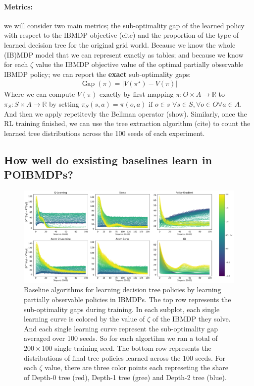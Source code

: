 \paragraph{Metrics:} we will consider two main metrics; the sub-optimality gap of the learned policy with respect to the IBMDP objective (cite) and the proportion of the type of learned decision tree for the original grid world.
Because we know the whole (IB)MDP model that we can represent exactly as tables; and because we know for each $\zeta$ value the IBMDP objective value of the optimal partially observable IBMDP policy; we can report the \textbf{exact} sub-optimality gaps:
\begin{align*}
    \operatorname{Gap}(\pi) = |V(\pi^{\star}) - V(\pi)|
\end{align*}
Where we can compute $V(\pi)$ exactly by first mapping $\pi : O \times A \rightarrow \mathbb{R}$ to $\pi_{S} : S \times A \rightarrow \mathbb{R}$ by setting $\pi_S (s, a) = \pi(o,a) \text{ if }o\in s$ $\forall s \in S, \forall o \in O \forall a \in A$.
And then we apply repetitevly the Bellman operator (show).
Similarly, once the RL training finished, we can use the tree extraction algorithm (cite) to count the learned tree distributions across the 100 seeds of each experiment.

\subsection{How well do exsisting baselines learn in POIBMDPs?}

\begin{figure}
    \centering
    \includegraphics[width=1\textwidth]{images/images_part1/learning_curves.pdf}
    \caption{Baseline algorithms for learning decision tree policies by learning partially observable policies in IBMDPs. 
    The top row represents the sub-optimality gaps during training. In each subplot, each single learning curve is colored by the value of $\zeta$ of the IBMDP they solve. And each single learning curve represent the sub-optimality gap averaged over 100 seeds.
    So for each algortihm we ran a total of $200 \times 100$ single training seed.
    The bottom row represents the distributions of final tree policies learned across the 100 seeds.
    For each $\zeta$ value, there are three color points each represeting the share of Depth-0 tree (red), Depth-1 tree (gree) and Depth-2 tree (blue).
    }\label{fig:rl-poibmdp}
\end{figure}


